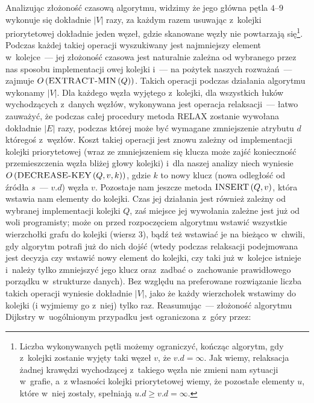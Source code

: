 Analizując złożoność czasową algorytmu, widzimy że jego główna pętla $4$--$9$ wykonuje się dokładnie $\left| V \right|$ razy, za każdym razem usuwając z~kolejki priorytetowej dokładnie jeden węzeł, gdzie skanowane węzły nie powtarzają się\footnote{
	Liczba wykonywanych pętli możemy ograniczyć, kończąc algorytm, gdy z~kolejki zostanie wyjęty taki węzeł $v$, że $v.d = \infty$.
	Jak wiemy, relaksacja żadnej krawędzi wychodzącej z~takiego węzła nie zmieni nam sytuacji w~grafie, a~z własności kolejki priorytetowej wiemy, że pozostałe elementy $u$, które w~niej zostały, spełniają $u.d \geqslant v.d = \infty$.
}.
Podczas każdej takiej operacji wyszukiwany jest najmniejszy element w~kolejce~--- jej złożoność czasowa jest naturalnie zależna od wybranego przez nas sposobu implementacji owej kolejki i~--- na pożytek naszych rozważań~--- zajmuje $O\left( \textrm{\textsc{EXTRACT-MIN}} \left( Q \right) \right)$.
Takich operacji podczas działania algorytmu wykonamy $\left| V \right|$.
Dla każdego węzła wyjętego z~kolejki, dla wszystkich łuków wychodzących z~danych węzłów, wykonywana jest operacja relaksacji~--- łatwo zauważyć, że podczas całej procedury metoda \textsc{RELAX} zostanie wywołana dokładnie $\left| E \right|$ razy, podczas której może być wymagane zmniejszenie atrybutu $d$ któregoś z~węzłów. Koszt takiej operacji jest znowu zależny od implementacji kolejki priorytetowej (wraz ze zmniejszeniem się klucza może zajść konieczność przemieszczenia węzła bliżej głowy kolejki) i~dla naszej analizy niech wyniesie $O \left( \textrm{\textsc{DECREASE-KEY}} \left( Q, v, k \right) \right)$, gdzie $k$ to nowy klucz (nowa odległość od źródła $s$~--- $v.d$) węzła $v$.
Pozostaje nam jeszcze metoda $\textrm{\textsc{INSERT}} \left( Q, v \right)$, która wstawia nam elementy do kolejki.
Czas jej działania jest również zależny od wybranej implementacji kolejki $Q$, zaś miejsce jej wywołania zależne jest już od woli programisty; może on przed rozpoczęciem algorytmu wstawić wszystkie wierzchołki grafu do kolejki (wiersz $3$), bądź też wstawiać je na bieżąco w~chwili, gdy algorytm potrafi już do nich dojść (wtedy podczas relaksacji podejmowana jest decyzja czy wstawić nowy element do kolejki, czy taki już w~kolejce istnieje i~należy tylko zmniejszyć jego klucz oraz~zadbać o~zachowanie prawidłowego porządku w~strukturze danych).
Bez względu na preferowane rozwiązanie liczba takich operacji wyniesie dokładnie $\left| V \right|$, jako że każdy wierzchołek wstawimy do kolejki (i wyjmiemy go z~niej) tylko raz.
Reasumując~--- złożoność algorytmu Dijkstry w~uogólnionym przypadku jest ograniczona z~góry przez:

